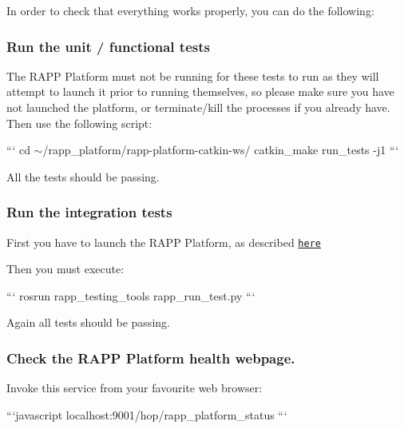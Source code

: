 In order to check that everything works properly, you can do the following\-:

\subsubsection*{Run the unit / functional tests}

The R\-A\-P\-P Platform must not be running for these tests to run as they will attempt to launch it prior to running themselves, so please make sure you have not launched the platform, or terminate/kill the processes if you already have. Then use the following script\-:

``` cd $\sim$/rapp\-\_\-platform/rapp-\/platform-\/catkin-\/ws/ catkin\-\_\-make run\-\_\-tests -\/j1 ```

All the tests should be passing.

\subsubsection*{Run the integration tests}

First you have to launch the R\-A\-P\-P Platform, as described \href{https://github.com/rapp-project/rapp-platform/wiki/How-do-I-launch-the-RAPP-Platform%3F}{\tt here}

Then you must execute\-:

``` rosrun rapp\-\_\-testing\-\_\-tools rapp\-\_\-run\-\_\-test.\-py ```

Again all tests should be passing.

\subsubsection*{Check the R\-A\-P\-P Platform health webpage.}

Invoke this service from your favourite web browser\-:

```javascript localhost\-:9001/hop/rapp\-\_\-platform\-\_\-status ``` 